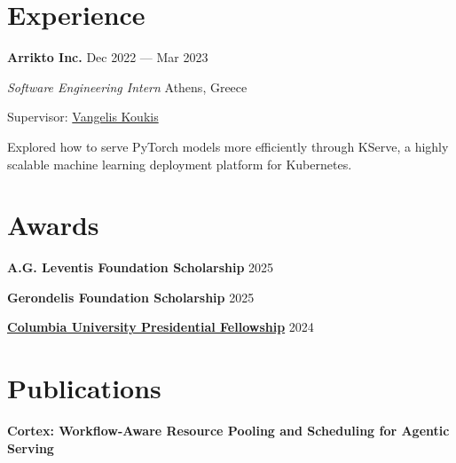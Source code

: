 \documentclass[margin,12pt]{resume}
\newcommand{\descriptionVSpace}{\vspace{0.5ex}\xspace}
\newcommand{\subsectionVSpace}{\vspace{3.5ex}\xspace}
\newcommand{\sectionVSpace}{\vspace{1ex}\xspace} %
\newcommand{\sectionVSpaceCorrection}{\vspace{-3.5ex}} %
\newcommand{\header}[1]{\textbf{#1}\xspace}
\newcommand{\company}[1]{\header{#1}\xspace}
\newcommand{\fellowship}[1]{\header{#1}\xspace}
\newcommand{\interval}[2]{#1 --- #2\xspace}
\newcommand{\paperTitle}[1]{\header{#1}\xspace}
\newcommand{\place}[1]{#1\xspace}
\newcommand{\role}[1]{\textit{#1}\xspace}
\newcommand{\stitle}[1]{#1:\xspace}
\newenvironment{rSubsection}{}{\par\subsectionVSpace}
\newenvironment{rSection}[1]{\sectionVSpaceCorrection\section{#1}\xspace}{\sectionVSpace\par}
\newenvironment{jobDuties}{\descriptionVSpace}{\par}
\begin{document}
\begin{resume}
\begin{rSection}{Experience}



        \begin{rSubsection}
            \company{Arrikto Inc.} \hfill \interval{Dec 2022}{Mar 2023}

            \role{Software Engineering Intern} \hfill \place{Athens, Greece}

            \stitle{Supervisor} \href{https://www.linkedin.com/in/vkoukis/}{Vangelis Koukis}

            \begin{jobDuties}
                Explored how to serve PyTorch models more efficiently through KServe, a highly scalable machine learning deployment platform for Kubernetes.
            \end{jobDuties}
        \end{rSubsection}
    \end{rSection}


    \begin{rSection}{Awards}
        \begin{rSubsection}
            \fellowship{A.G. Leventis Foundation Scholarship} \hfill 2025
        \end{rSubsection}

        \begin{rSubsection}
            \fellowship{Gerondelis Foundation Scholarship} \hfill 2025
        \end{rSubsection}

        \begin{rSubsection}
            \fellowship{\href{https://www.cs.columbia.edu/2024/meet-the-scholars-phd-students-with-prestigious-fellowships/}{Columbia University Presidential Fellowship}} \hfill 2024
        \end{rSubsection}
    \end{rSection}

    \begin{rSection}{Publications}
        \begin{rSubsection}
            \paperTitle{Cortex: Workflow-Aware Resource Pooling and Scheduling for Agentic Serving}


\end{rSubsection}
\end{rSection}
\end{resume}
\end{document}
